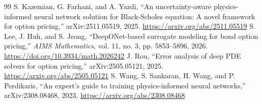 \documentclass[11pt,a4paper]{article}
\begin{document}
\begin{thebibliography}{99}
 S. Kazemian, G. Farhani, and A. Yazdi, ``An uncertainty-aware physics-informed neural network solution for Black-Scholes equation: A novel framework for option pricing,'' arXiv:2511.05519, 2025. \url{https://arxiv.org/abs/2511.05519}
 S. Lee, J. Huh, and S. Jeong, ``DeepONet-based surrogate modeling for bond option pricing,'' \emph{AIMS Mathematics}, vol. 11, no. 3, pp. 5853--5896, 2026. \url{https://doi.org/10.3934/math.2026242}
 J. Rou, ``Error analysis of deep PDE solvers for option pricing,'' arXiv:2505.05121, 2025. \url{https://arxiv.org/abs/2505.05121}
 S. Wang, S. Sankaran, H. Wang, and P. Perdikaris, ``An expert's guide to training physics-informed neural networks,'' arXiv:2308.08468, 2023. \url{https://arxiv.org/abs/2308.08468}
\end{thebibliography}
\end{document}
